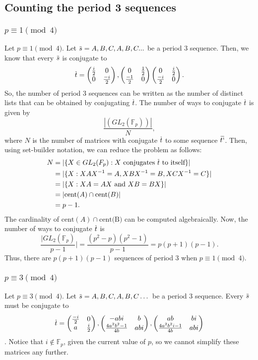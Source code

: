\documentclass[12pt, letterpaper]{article}
\theoremstyle{definition}
\newcommand{\overbar}[1]{\mkern 1.5mu\overline{\mkern-1.5mu#1\mkern-1.5mu}\mkern 1.5mu}
\newcommand{\F}{\mathbb{F}}
\begin{document}
\subsection{Counting the period 3 sequences}
\subsubsection{$p\equiv 1 \pmod 4$} Let $p \equiv 1 \pmod 4$. Let $\overbar{s} = A,B,C,A,B,C...$ be a period 3 sequence. Then, we know that every $\overbar{s}$ is conjugate to \[\overbar{t} =
\begin{pmatrix}
\frac{i}{2} & 0\\
0 & \frac{-i}{2}
\end{pmatrix},
\begin{pmatrix}
0 & \frac{1}{2} \\
\frac{-1}{2} & 0
\end{pmatrix}
\begin{pmatrix}
0 & \frac{i}{2} \\
\frac{-i}{2} & 0
\end{pmatrix}.
\]
So, the number of period 3 sequences can be written as the number of distinct lists that can be obtained by conjugating $\overbar{t}$. The number of ways to conjugate $\overbar{t}$ is given by \[\frac{|(GL_2(\F_p))|}{N},\]
where $N$ is the number of matrices with conjugate $\overbar{t}$ to some sequence $\overbar{t`}$.  Then, using set-builder notation, we can reduce the problem as follows:
\begin{align*}
N &= |\{X \in GL_2(F_p):\text{$X$ conjugates $\overbar{t}$ to itself}\}| \\
&= |\{X:XAX^{-1}=A,XBX^{-1}=B,XCX^{-1}=C\}| \\
&= |\{X:XA=AX \text{ and } XB=BX\}| \\
&= |\text{cent}(A) \cap \text{cent}(B)| \\
&= p-1.
\end{align*}
The cardinality of $\text{cent}(A) \cap\text{cent(B)}$ can be computed algebraically. Now, the number of ways to conjugate $\overbar{t}$ is
\[\frac{|GL_2(\F_p)}{p-1}| = \frac{(p^2-p)(p^2-1)}{p-1} = p(p+1)(p-1).\] Thus, there are $p(p+1)(p-1)$ sequences of period 3 when $p \equiv 1\pmod 4$.
\subsubsection{$p\equiv 3\pmod 4$}Let $p \equiv 3\pmod 4$. Let $\overbar{s} = A,B,C,A,B,C\dots$ be a period 3 sequence. Every $\overbar{s}$ must be conjugate to  \[\overbar{t} = \begin{pmatrix}
\frac{-i}{2} & 0 \\
a & \frac{i}{2}
\end{pmatrix},
\begin{pmatrix}
-abi & b\\
\frac{4a^2b^2-1}{4b} & abi
\end{pmatrix},
\begin{pmatrix}
ab & bi\\
\frac{4a^2b^2i-1}{4b} & abi
\end{pmatrix}\].  Notice that $i \notin \F_p$, given the current value of $p$, so we cannot simplify these matrices any further.
\end{document}

